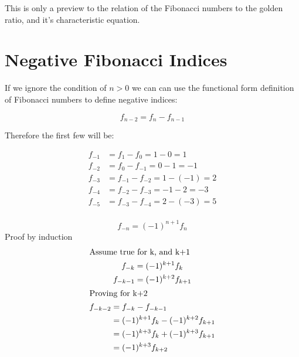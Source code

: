 \documentclass[a4paper]{article}
\begin{document}
This is only a preview to the relation of the Fibonacci numbers to the golden ratio, and it's characteristic equation.

\section{Negative Fibonacci Indices}\label{fib:sec:negative}
If we ignore the condition of $n>0$ we can can use the functional form definition of Fibonacci numbers to define negative indices:

\begin{equation}
f_{n-2} = f_n - f_{n-1}\label{fib:eq:equation3}
\end{equation}

%

Therefore the first few will be:

\begin{align*}
f_{-1} &= f_{1} - f_{0} = 1 - 0 = 1\\
f_{-2} &= f_{0} - f_{-1} = 0 - 1 = -1\\
f_{-3} &= f_{-1} - f_{-2} = 1 - (-1) = 2\\
f_{-4} &= f_{-2} - f_{-3} = -1 - 2 = -3\\
f_{-5} &= f_{-3} - f_{-4} = 2 - (-3)= 5\\
\end{align*}

\begin{theorem}
\[
f_{-n} = (-1)^{n+1} f_{n}
\]
Proof by induction
\begin{gather*}
\shortintertext{Assume true for k, and k+1}
f_{-k} = (-1)^{k+1} f_{k}\\
f_{-k-1} = (-1)^{k+2} f_{k+1}\\
\shortintertext{Proving for k+2}
\begin{split}
f_{-k-2} &= f_{-k} - f_{-k-1} \\
		&= (-1)^{k+1} f_{k} - (-1)^{k+2} f_{k+1}\\
		 &= (-1)^{k+3} f_{k} + (-1)^{k+3} f_{k+1} \\
		 &= (-1)^{k+3} f_{k+2}
\\
\end{split}
\end{gather*}
\end{theorem}
\end{document}
